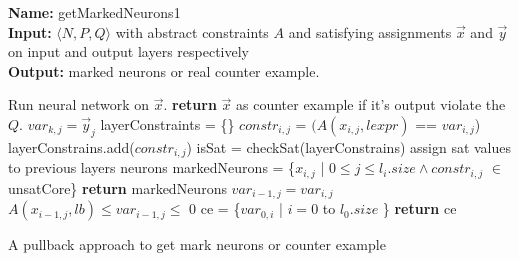 \begin{algorithm}[t]
  \textbf{Name: } getMarkedNeurons1 \\
  \textbf{Input: } $\langle N,P,Q \rangle$ with abstract constraints $A$ and satisfying assignments $\overrightarrow{x}$ and $\overrightarrow{y}$ on input and output layers respectively\\
  \textbf{Output: } marked neurons or real counter example. 
  \begin{algorithmic}[1]
   \State Run neural network on $\overrightarrow{x}$.
   \State \textbf{return} $\overrightarrow{x}$ as counter example if it's output violate the $Q$. 
    \State $var_{k,j} = \overrightarrow{y}_j$
   \EndFor
        \State layerConstraints = \{\}
          \State $constr_{i,j}$ = $(A(x_{i,j},lexpr)$ == $var_{i,j}$) 
          \State layerConstrains.add($constr_{i,j}$)
        \EndFor
        \State isSat = checkSat(layerConstrains) 
          \State assign sat values to previous layers neurons
        \Else
          \State markedNeurons = \{$x_{i,j}$ | $0 \leq j\leq l_i.size \land constr_{i,j}$ $\in$ unsatCore\}
          \State \textbf{return } markedNeurons
        \EndIf
      \Else {}
            \State $var_{i-1,j} = var_{i,j}$
          \Else
            \State $A(x_{i-1,j},lb) \leq var_{i-1,j} \leq$ 0 
          \EndIf
        \EndFor
      \EndIf
   \EndFor
    \State ce = \{$var_{0,i}$ | $i=0$ to $l_{0}.size$ \} 
    \State \textbf{return} ce
  \end{algorithmic}
  \caption{A pullback approach to get mark neurons or counter example}
  \label{algo:refine1}
\end{algorithm}


